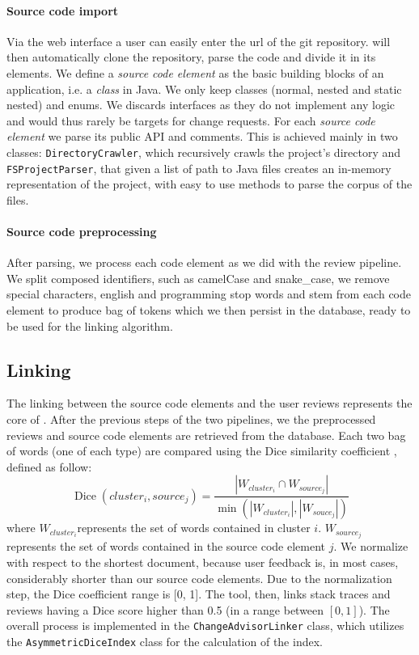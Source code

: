\paragraph{Source code import} 
Via the web interface a user can easily enter the url of the git repository. \tool{} will then automatically clone the repository, parse the code and divide it in its elements. We define a \textit{source code element} as the basic building blocks of an application, i.e. a \textit{class} in Java. We only keep classes (normal, nested and static nested) and enums. We discards interfaces as they do not implement any logic and would thus rarely be targets for change requests.
For each \textit{source code element} we parse its public API and comments. This is achieved mainly in two classes: \texttt{DirectoryCrawler}, which recursively crawls the project's directory and \texttt{FSProjectParser}, that given a list of path to Java files creates an in-memory representation of the project, with easy to use methods to parse the corpus of the files.

\paragraph{Source code preprocessing}
After parsing, we process each code element as we did with the review pipeline.
We split composed identifiers, such as camelCase and snake\_case, we remove special characters, english and programming stop words and stem from each code element to produce bag of tokens which we then persist in the database, ready to be used for the linking algorithm. 

%
%
\subsection{Linking}
The linking between the source code elements and the user reviews represents the core of \tool{}. After the previous steps of the two pipelines, we the preprocessed reviews and source code elements are retrieved from the database.
Each two bag of words (one of each type) are compared using the Dice similarity coefficient \cite{dice1945measures}, defined as follow:
\begin{equation*}
	\operatorname{Dice}\left(\mathit{cluster}_{i}, \mathit{source}_{j}\right) = \frac{\left|\mathit{W}_{\mathit{cluster}_{i}} \cap \mathit{W}_{\mathit{source}_{j}}\right|}{\min\left(\left|\mathit{W}_{\mathit{cluster}_{i}}\right|, \left|\mathit{W}_{\mathit{souce}_{j}}\right|\right)}
\end{equation*}
where $\mathit{W}_{\mathit{cluster}_{i}}$represents the set of words contained in cluster $i$. $\mathit{W}_{\mathit{source}_{j}}$ represents the set of words contained in the source code element $j$.
We normalize with respect to the shortest document, because user feedback is, in most cases, considerably shorter than our source code elements. Due to the normalization step, the Dice coefficient range is [0, 1].
The tool, then, links stack traces and reviews having a Dice score higher than 0.5 (in a range between $\left[0, 1\right]$).
The overall process is implemented in the \texttt{ChangeAdvisorLinker} class, which utilizes the \texttt{AsymmetricDiceIndex} class for the calculation of the index.
